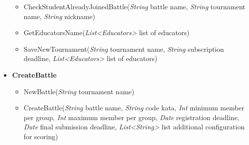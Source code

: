 \begin{itemize}
\begin{itemize}
        \item CheckStudentAlreadyJoinedBattle(\textit{String} battle name, \textit{String} tournament name, \textit{String} nickname)
        \item GetEducatorsName(\textit{List\textless Educators\textgreater} list of educators)
        \item SaveNewTournament(\textit{String} tournament name, \textit{String} subscription deadline, \textit{List\textless Educators\textgreater} list of educators)
\end{itemize}

    \item \textbf{\textbf{CreateBattle}}

\begin{itemize}
        \item NewBattle(\textit{String} tournament name)
        \item CreateBattle(\textit{String} battle name, \textit{String} code kata, \textit{Int}  minimum member per group, \textit{Int}  maximum member per group, \textit{Date} registration deadline, \textit{Date} final submission deadline, \textit{List\textless String\textgreater} list additional configuration for scoring)
\end{itemize}

\end{itemize}


